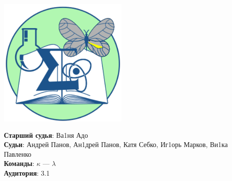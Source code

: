 \documentclass[12pt]{article}
\begin{document}
\begin{minipage}{.30\textwidth}
\begin{center}
\includegraphics[width=0.48\textwidth]{klshlogo.pdf}
\end{center}
\end{minipage}
\begin{minipage}{.65\textwidth}
\begin{flushleft}
{\bf Старший судья}: Ва1ня Адо\\ 
{\bf Судьи}: Андрей Панов, Ан1дрей Панов, Катя Себко, Иг1орь Марков, Ви1ка Павленко\\ 
{\bf Команды}: $\kappa$ --- $\lambda$\\ 
{\bf Аудитория}: 3.1\\ 
\end{flushleft}
\end{minipage}
\end{document}

